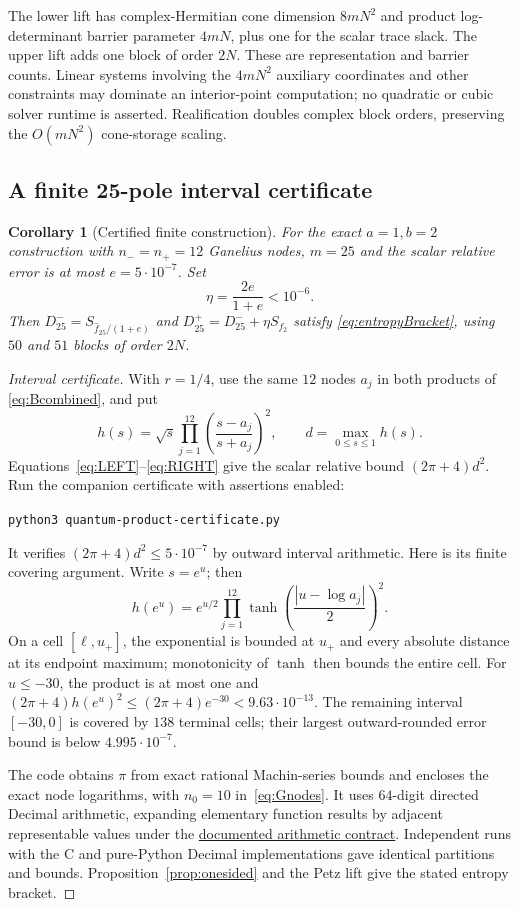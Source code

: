 \documentclass[11pt]{article}
\newtheorem{corollary}[theorem]{Corollary}
\numberwithin{equation}{section}
\begin{document}
The lower lift has complex-Hermitian cone dimension $8mN^2$ and
product log-determinant barrier parameter $4mN$, plus one for the
scalar trace slack. The upper lift adds one block of order $2N$.
These are representation and barrier counts. Linear systems involving
the $4mN^2$ auxiliary coordinates and other constraints may dominate
an interior-point computation; no quadratic or cubic solver runtime
is asserted. Realification doubles complex block orders, preserving
the $O(mN^2)$ cone-storage scaling.

\subsection{A finite 25-pole interval certificate}

\begin{corollary}[Certified finite construction]\label{cor:finite25}
For the exact $a=1,b=2$ construction with $n_-=n_+=12$ Ganelius
nodes, $m=25$ and the scalar relative error is at most
$e=5\cdot10^{-7}$. Set
\[
 \eta=\frac{2e}{1+e}<10^{-6}.
\]
Then $D_{25}^-=S_{\widehat f_{25}/(1+e)}$ and
$D_{25}^+=D_{25}^-+\eta S_{f_2}$ satisfy
\eqref{eq:entropyBracket}, using $50$ and $51$ blocks of order $2N$.
\end{corollary}

\begin{proof}[Interval certificate]
With $r=1/4$, use the same $12$ nodes $a_j$ in both products of
\eqref{eq:Bcombined}, and put
\[
 h(s)=\sqrt{s}\prod_{j=1}^{12}
             \left(\frac{s-a_j}{s+a_j}\right)^2,
 \qquad d=\max_{0\le s\le1}h(s).
\]
Equations~\eqref{eq:LEFT}--\eqref{eq:RIGHT} give the scalar relative
bound $(2\pi+4)d^2$. Run the companion certificate with assertions enabled:
\begin{center}
 \texttt{python3 quantum-product-certificate.py}
\end{center}
It verifies $(2\pi+4)d^2\le5\cdot10^{-7}$ by outward interval arithmetic.
Here is its finite covering argument. Write $s=e^u$; then
\[
 h(e^u)=e^{u/2}\prod_{j=1}^{12}
                  \tanh\!\left(\frac{|u-\log a_j|}{2}\right)^2.
\]
On a cell $[\ell,u_+]$, the exponential is bounded at $u_+$ and every
absolute distance at its endpoint maximum; monotonicity of $\tanh$
then bounds the entire cell. For $u\le-30$, the product is at most
one and $(2\pi+4)h(e^u)^2\le(2\pi+4)e^{-30}<9.63\cdot10^{-13}$.
The remaining interval $[-30,0]$ is covered by $138$ terminal cells;
their largest outward-rounded error bound is below $4.995\cdot10^{-7}$.

The code obtains $\pi$ from exact rational Machin-series bounds and
encloses the exact node logarithms, with $n_0=10$ in~\eqref{eq:Gnodes}.
It uses $64$-digit directed Decimal arithmetic, expanding elementary
function results by adjacent representable values under the
\href{https://docs.python.org/3.14/library/decimal.html}{documented arithmetic contract}.
Independent runs with the C and pure-Python Decimal implementations
gave identical partitions and bounds. Proposition~\ref{prop:onesided}
and the Petz lift give the stated entropy bracket.
\end{proof}
\end{document}
